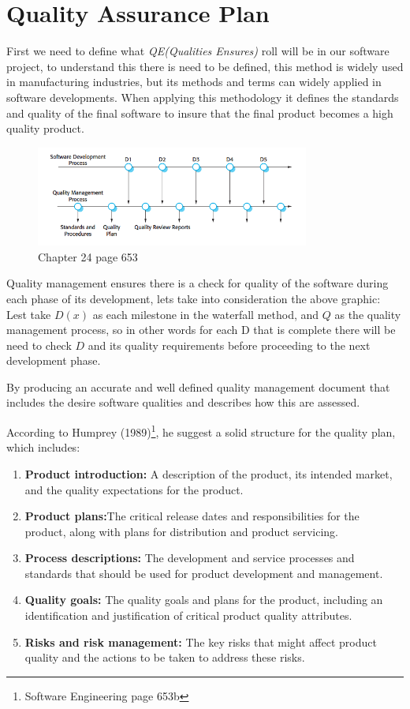 \section*{Quality Assurance Plan}


First we need to define what \textit{QE(Qualities Ensures)}  roll will be in our software project, to understand this there is need to be defined,  this method is widely used in manufacturing industries, but its methods and terms can widely applied in software developments. When applying this methodology  it defines the standards and quality of the final software to insure that the final product becomes a high quality product.

\begin{figure}[ht!]
\centering
\includegraphics[width=90mm]{graphics/quality.png}
\caption{Chapter 24 page 653}
\label{overflow}
\end{figure}


Quality management ensures there is a check for quality of the software during each phase of its development,  lets take into consideration the above graphic: Lest take $D(x)$ as each milestone in the waterfall method, and $Q$ as the quality management process, so in other words for each D that is complete there will be need to check $D$ and its quality requirements before proceeding to the next development phase.


By producing an accurate and well defined quality management document that includes the desire software qualities and describes how this are assessed. 

According to Humprey (1989)\footnote{Software Engineering page 653b
}, he suggest a solid structure for the quality plan, which includes:

\begin{enumerate}
	\item \textbf{Product introduction:} A description of the product, its intended market, and the quality expectations for the product.
	\item \textbf{Product plans:}The critical release dates and responsibilities for the product, along with plans for distribution and product servicing.
	\item \textbf{Process descriptions:} The development and service processes and standards that should be used for product development and management.
	\item \textbf{Quality goals:} The quality goals and plans for the product, including an identification and justification of critical product quality attributes. 
	\item \textbf{Risks and risk management:} The key risks that might affect product quality and the actions to be taken to address these risks.
\end{enumerate}



